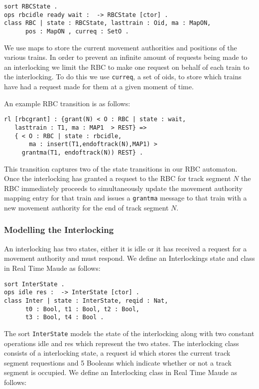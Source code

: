 \begin{lstlisting}[caption = The RBC state and class definition in Maude]
sort RBCState .
ops rbcidle ready wait :  -> RBCState [ctor] .
class RBC | state : RBCState, lasttrain : Oid, ma : MapON, 
      pos : MapON , curreq : SetO .
\end{lstlisting}

We use maps to store the current movement authorities and positions of the various trains. In order to prevent an infinite amount of requests being made to an interlocking we limit the RBC to make one request on behalf of each train to the interlocking.  To do this we use  \texttt{curreq}, a set of oids, to store which trains have had a request made for them at a given moment of time.

An example RBC transition is as follows:
\begin{lstlisting}[caption = The state transition for the granting of a movement authority]
rl [rbcgrant] : {grant(N) < O : RBC | state : wait, 
   lasttrain : T1, ma : MAP1  > REST} => 
   { < O : RBC | state : rbcidle, 
       ma : insert(T1,endoftrack(N),MAP1) > 
     grantma(T1, endoftrack(N)) REST} .
\end{lstlisting}

This transition captures two of the state transitions in our RBC automaton. Once the interlocking has granted a request to the RBC for track segment $N$ the RBC immediately proceeds to simultaneously update the movement authority mapping entry for that train and issues a \texttt{grantma} message to that train with a new movement authority for the end of track segment $N$.

\subsubsection*{Modelling the Interlocking}
An interlocking has two states, either it is idle or it has received a request for a movement authority and must respond. We define an Interlockings state and class in Real Time Maude as follows:

\begin{lstlisting}[caption = The interlocking class and states in Maude]
sort InterState .
ops idle res :  -> InterState [ctor] .
class Inter | state : InterState, reqid : Nat, 
      t0 : Bool, t1 : Bool, t2 : Bool, 
      t3 : Bool, t4 : Bool .
\end{lstlisting}

The sort \texttt{InterState} models the state of the interlocking along with two constant operations idle and res which represent the two states. The interlocking class consists of a interlocking state, a request id which stores the current track segment requestions and 5 Booleans which indicate whether or not a track segment is occupied. We define an Interlocking class in Real Time Maude as follows:


